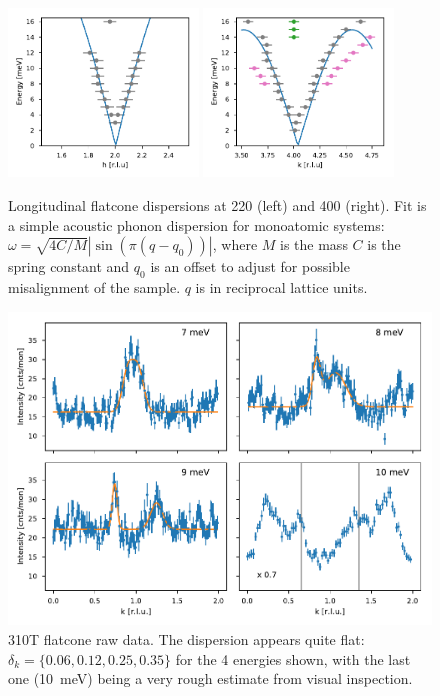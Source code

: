 \begin{figure}
    \centering
    \includegraphics[width=0.45\textwidth]{fig/lowen/dispersion_220L.pdf}
    \includegraphics[width=0.45\textwidth]{fig/lowen/dispersion_400L.pdf}
    \caption[flatcone dispersion 220L/400L]{Longitudinal flatcone dispersions at 220 (left) and 400 (right). Fit is a simple acoustic phonon dispersion for monoatomic systems: $\omega = \sqrt{4C/M} | \sin ( \pi (q-q_0) ) | $, where $M$ is the mass $C$ is the spring constant and $q_0$ is an offset to adjust for possible misalignment of the sample. $q$ is in reciprocal lattice units.}
\end{figure}

\begin{figure}
    \centering
    \includegraphics[width=\textwidth]{fig/lowen/fits_310T.pdf}
    \caption[310T flatcone raw data]{310T flatcone raw data. The dispersion appears quite flat: $\delta_k = \{ 0.06, 0.12, 0.25, 0.35 \}$ for the 4 energies shown, with the last one (\SI{10}{\milli\eV}) being a very rough estimate from visual inspection.}
    \label{fig:flatcone_phonons_310T_raw}    
\end{figure}

